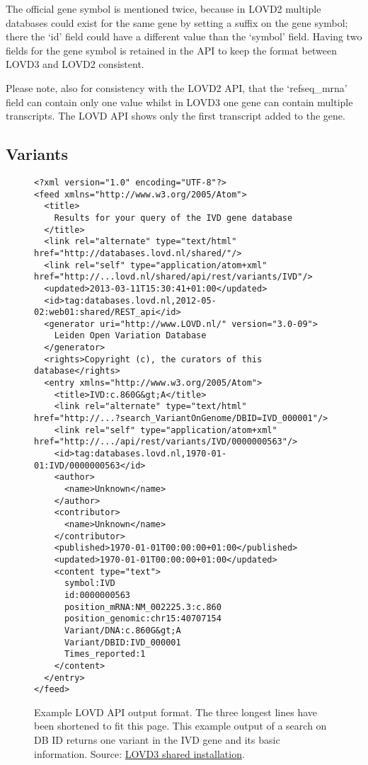 \documentclass[a4paper,oneside,openany,12pt]{memoir}
\begin{document}
The official gene symbol is mentioned twice, because in LOVD2 multiple databases could exist for the same gene by
 setting a suffix on the gene symbol; there the `id' field could have a different value than the `symbol' field.
Having two fields for the gene symbol is retained in the API to keep the format between LOVD3 and LOVD2 consistent.

Please note, also for consistency with the LOVD2 API, that the `refseq\_mrna' field can
 contain only one value whilst in LOVD3 one gene can contain multiple transcripts.
The LOVD API shows only the first transcript added to the gene.



\subsection{Variants}
\begin{figure}[ht]
  \begin{shaded}
    \scriptsize
    \begin{verbatim}
<?xml version="1.0" encoding="UTF-8"?>
<feed xmlns="http://www.w3.org/2005/Atom">
  <title>
    Results for your query of the IVD gene database
  </title>
  <link rel="alternate" type="text/html" href="http://databases.lovd.nl/shared/"/>
  <link rel="self" type="application/atom+xml" href="http://...lovd.nl/shared/api/rest/variants/IVD"/>
  <updated>2013-03-11T15:30:41+01:00</updated>
  <id>tag:databases.lovd.nl,2012-05-02:web01:shared/REST_api</id>
  <generator uri="http://www.LOVD.nl/" version="3.0-09">
    Leiden Open Variation Database
  </generator>
  <rights>Copyright (c), the curators of this database</rights>
  <entry xmlns="http://www.w3.org/2005/Atom">
    <title>IVD:c.860G&gt;A</title>
    <link rel="alternate" type="text/html" href="http://...?search_VariantOnGenome/DBID=IVD_000001"/>
    <link rel="self" type="application/atom+xml" href="http://.../api/rest/variants/IVD/0000000563"/>
    <id>tag:databases.lovd.nl,1970-01-01:IVD/0000000563</id>
    <author>
      <name>Unknown</name>
    </author>
    <contributor>
      <name>Unknown</name>
    </contributor>
    <published>1970-01-01T00:00:00+01:00</published>
    <updated>1970-01-01T00:00:00+01:00</updated>
    <content type="text">
      symbol:IVD
      id:0000000563
      position_mRNA:NM_002225.3:c.860
      position_genomic:chr15:40707154
      Variant/DNA:c.860G&gt;A
      Variant/DBID:IVD_000001
      Times_reported:1
    </content>
  </entry>
</feed>
    \end{verbatim}
  \caption{%
    Example LOVD API output format.
    The three longest lines have been shortened to fit this page.
    This example output of a search on DB ID returns one variant in the IVD gene and its basic information.
    Source: \href{http://databases.lovd.nl/shared/api/rest/variants/IVD?search_Variant/DBID=IVD_000001}
     {LOVD3 shared installation}.}
  \end{shaded}
\end{figure}
\end{document}
